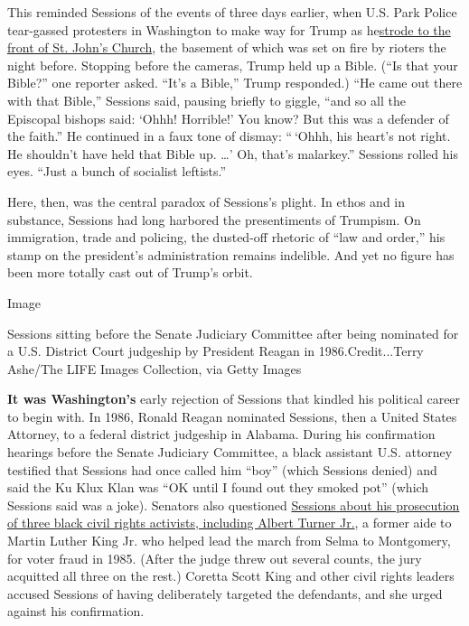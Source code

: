 This reminded Sessions of the events of three days earlier, when U.S.
Park Police tear-gassed protesters in Washington to make way for Trump
as
he\href{https://www.nytimes3xbfgragh.onion/2020/06/02/us/politics/trump-walk-lafayette-square.html}{strode
to the front of St. John's Church}, the basement of which was set on
fire by rioters the night before. Stopping before the cameras, Trump
held up a Bible. (``Is that your Bible?'' one reporter asked. ``It's a
Bible,'' Trump responded.) ``He came out there with that Bible,''
Sessions said, pausing briefly to giggle, ``and so all the Episcopal
bishops said: `Ohhh! Horrible!' You know? But this was a defender of the
faith.'' He continued in a faux tone of dismay: `` `Ohhh, his heart's
not right. He shouldn't have held that Bible up. \ldots{}' Oh, that's
malarkey.'' Sessions rolled his eyes. ``Just a bunch of socialist
leftists.''

Here, then, was the central paradox of Sessions's plight. In ethos and
in substance, Sessions had long harbored the presentiments of Trumpism.
On immigration, trade and policing, the dusted-off rhetoric of ``law and
order,'' his stamp on the president's administration remains indelible.
And yet no figure has been more totally cast out of Trump's orbit.

Image

Sessions sitting before the Senate Judiciary Committee after being
nominated for a U.S. District Court judgeship by President Reagan in
1986.Credit...Terry Ashe/The LIFE Images Collection, via Getty Images

\textbf{It was Washington's} early rejection of Sessions that kindled
his political career to begin with. In 1986, Ronald Reagan nominated
Sessions, then a United States Attorney, to a federal district judgeship
in Alabama. During his confirmation hearings before the Senate Judiciary
Committee, a black assistant U.S. attorney testified that Sessions had
once called him ``boy'' (which Sessions denied) and said the Ku Klux
Klan was ``OK until I found out they smoked pot'' (which Sessions said
was a joke). Senators also questioned
\href{https://www.nytimes3xbfgragh.onion/2017/01/09/magazine/the-voter-fraud-case-jeff-sessions-lost-and-cant-escape.html}{Sessions
about his prosecution of three black civil rights activists, including
Albert Turner Jr.}, a former aide to Martin Luther King Jr. who helped
lead the march from Selma to Montgomery, for voter fraud in 1985. (After
the judge threw out several counts, the jury acquitted all three on the
rest.) Coretta Scott King and other civil rights leaders accused
Sessions of having deliberately targeted the defendants, and she urged
against his confirmation.

